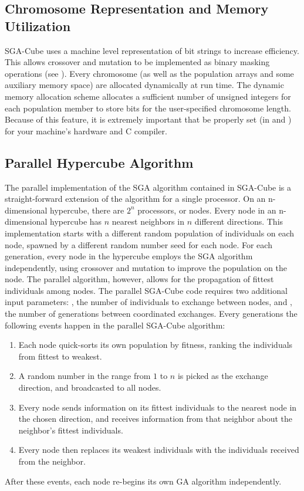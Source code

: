 \subsection{Chromosome Representation and Memory Utilization}
\label{memstuff}
SGA-Cube uses a machine level representation of bit strings
to increase efficiency.
This allows crossover and mutation to be implemented 
as binary masking operations (see {}).
Every chromosome (as well as the population arrays and some
auxiliary memory space) are allocated dynamically at run
time. The dynamic memory allocation scheme allocates
a sufficient number of unsigned integers for each population member
to store bits for the user-specified chromosome length. Because
of this feature, it is extremely important that {}
be properly set (in
{} and {})
for your machine's hardware and C compiler.

\subsection{Parallel Hypercube Algorithm}
\label{parallel}
The parallel implementation of the SGA algorithm contained in SGA-Cube
is a straight-forward extension of the algorithm for a single processor.  
On an n-dimensional hypercube, there are $2^n$ processors, or nodes.  
Every node in an n-dimensional hypercube has $n$
nearest neighbors in $n$ different directions.  This implementation
starts with a different random population of individuals on each node,
spawned by a different random number seed for each node.  For each generation,
every node in the hypercube employs the SGA algorithm independently, using
crossover and mutation to improve the population on the node.  The parallel
algorithm, however, allows for the propagation of fittest individuals among
nodes.  The parallel SGA-Cube code requires two additional input parameters:
{}, the number of individuals to exchange between nodes, and
{}, the number of generations between coordinated exchanges.
Every {} generations the following events happen in the
parallel SGA-Cube algorithm:
\begin{enumerate}
\item Each node quick-sorts its own population by fitness, ranking the 
individuals from fittest to weakest.
\item A random number in the range from $1$ to $n$ is picked as the 
exchange direction, and broadcasted to all nodes.
\item Every node sends information on its {} fittest 
individuals to the nearest node in the chosen direction, and receives
information from that neighbor about the neighbor's fittest individuals.
\item Every node then replaces its {} weakest individuals
with the individuals received from the neighbor.
\end{enumerate}
After these events, each node re-begins
its own GA algorithm independently.

